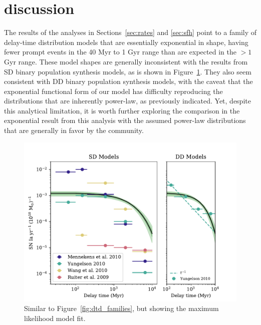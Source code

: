 \documentclass[apj]{aastex62}
\begin{document}
\section{discussion}\label{sec:discussion}
The results of the analyses in Sections~\ref{sec:rates} and \ref{sec:sfh} point to a family of delay-time distribution models that are essentially exponential in shape, having fewer prompt events in the 40 Myr to 1 Gyr range than are expected in the $>1$ Gyr range. These model shapes are generally inconsistent with the results from SD binary population synthesis models, as is shown in Figure~\ref{fig:dtd_eval}. They also seem consistent with DD binary population synthesis models, with the caveat that the exponential functional form of our model has difficulty reproducing the distributions that are inherently power-law, as previously indicated. Yet, despite this analytical limitation, it is worth further exploring the comparison in the exponential result from this analysis with the assumed power-law distributions that are generally in favor by the community.
\begin{figure}[t]
   \centering
   \includegraphics[width=6.1in]{figure_pwr_law.pdf}
   \caption{\footnotesize Similar to Figure~\ref{fig:dtd_families}, but showing the maximum likelihood model fit.}
   \label{fig:dtd_eval}
\end{figure}
\end{document}
